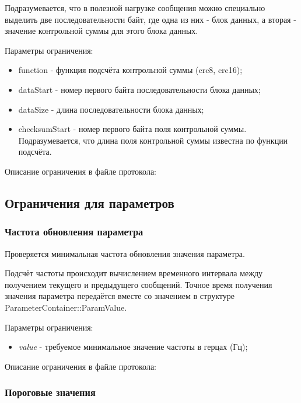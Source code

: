 Подразумевается, что в полезной нагрузке сообщения можно специально выделить 
две последовательности байт, где одна из них - блок данных, а вторая - значение 
контрольной суммы для этого блока данных.

Параметры ограничения:

\begin{itemize}
 \item function - функция подсчёта контрольной суммы (crc8, crc16);
 \item dataStart - номер первого байта последовательности блока данных;
 \item dataSize - длина последовательности блока данных;
 \item checksumStart - номер первого байта поля контрольной суммы. 
Подразумевается, что длина поля контрольной суммы известна по функции подсчёта.
\end{itemize}

Описание ограничения в файле протокола:



\subsection{Ограничения для параметров}

\subsubsection{Частота обновления параметра}

Проверяется минимальная частота обновления значения параметра.

Подсчёт частоты происходит вычислением временного интервала между получением 
текущего и предыдущего сообщений. Точное время получения значения
параметра передаётся вместе со значением в структуре 
ParameterContainer::ParamValue.

Параметры ограничения:

\begin{itemize}
 \item \textit{value} - требуемое минимальное значение частоты в герцах (Гц);
\end{itemize}

Описание ограничения в файле протокола:



\subsubsection{Пороговые значения}

